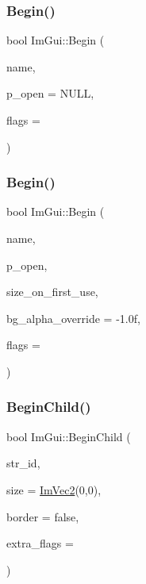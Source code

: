 \hypertarget{namespace_im_gui_a581e58db0bc930bafa4a5d23093a2b99}{}\label{namespace_im_gui_a581e58db0bc930bafa4a5d23093a2b99} 
\subsubsection{\texorpdfstring{Begin()}{Begin()}\hspace{0.1cm}{\footnotesize\ttfamily [1/2]}}
{\footnotesize\ttfamily bool Im\+Gui\+::\+Begin (\begin{DoxyParamCaption}\item[{const char $\ast$}]{name,  }\item[{bool $\ast$}]{p\+\_\+open = {\ttfamily NULL},  }\item[{Im\+Gui\+Window\+Flags}]{flags = {} }\end{DoxyParamCaption})}

\hypertarget{namespace_im_gui_a288e01ff1c8102d6374a6b1e409b9878}{}\label{namespace_im_gui_a288e01ff1c8102d6374a6b1e409b9878} 
\subsubsection{\texorpdfstring{Begin()}{Begin()}\hspace{0.1cm}{\footnotesize\ttfamily [2/2]}}
{\footnotesize\ttfamily bool Im\+Gui\+::\+Begin (\begin{DoxyParamCaption}\item[{const char $\ast$}]{name,  }\item[{bool $\ast$}]{p\+\_\+open,  }\item[{const \hyperlink{struct_im_vec2}{Im\+Vec2} \&}]{size\+\_\+on\+\_\+first\+\_\+use,  }\item[{float}]{bg\+\_\+alpha\+\_\+override = {\ttfamily -\/1.0f},  }\item[{Im\+Gui\+Window\+Flags}]{flags = {} }\end{DoxyParamCaption})}

\hypertarget{namespace_im_gui_a93b10a516e6da427b743906ad97d7f16}{}\label{namespace_im_gui_a93b10a516e6da427b743906ad97d7f16} 
\subsubsection{\texorpdfstring{Begin\+Child()}{BeginChild()}\hspace{0.1cm}{\footnotesize\ttfamily [1/2]}}
{\footnotesize\ttfamily bool Im\+Gui\+::\+Begin\+Child (\begin{DoxyParamCaption}\item[{const char $\ast$}]{str\+\_\+id,  }\item[{const \hyperlink{struct_im_vec2}{Im\+Vec2} \&}]{size = {\ttfamily \hyperlink{struct_im_vec2}{Im\+Vec2}(0,0)},  }\item[{bool}]{border = {\ttfamily false},  }\item[{Im\+Gui\+Window\+Flags}]{extra\+\_\+flags = {} }\end{DoxyParamCaption})}

